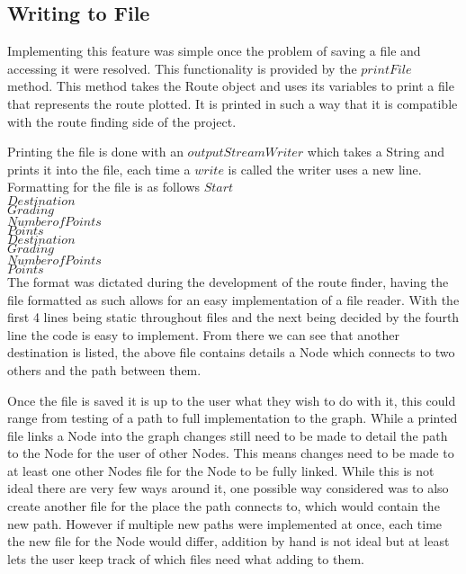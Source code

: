 \subsection{Writing to File}
Implementing this feature was simple once the problem of saving a file and accessing it were resolved. This functionality is provided by the $printFile$ method. This method takes the Route object and uses its variables to print a file that represents the route plotted. It is printed in such a way that it is compatible with the route finding side of the project. 

Printing the file is done with an $outputStreamWriter$ which takes a String and prints it into the file, each time a $write$ is called the writer uses a new line. Formatting for the file is as follows
$Start$\\
$Destination$\\
$Grading$\\
$Number of Points$\\
$Points$\\
$Destination$\\
$Grading$\\
$Number of Points$\\
$Points$\\
The format was dictated during the development of the route finder, having the file formatted as such allows for an easy implementation of a file reader. With the first 4 lines being static throughout files and the next being decided by the fourth line the code is easy to implement. From there we can see that another destination is listed, the above file contains details a Node which connects to two others and the path between them. 

Once the file is saved it is up to the user what they wish to do with it, this could range from testing of a path to full implementation to the graph. While a printed file links a Node into the graph changes still need to be made to detail the path to the Node for the user of other Nodes. This means changes need to be made to at least one other Nodes file for the Node to be fully linked. While this is not ideal there are very few ways around it, one possible way considered was to also create another file for the place the path connects to, which would contain the new path. However if multiple new paths were implemented at once, each time the new file for the Node would differ, addition by hand is not ideal but at least lets the user keep track of which files need what adding to them. 

